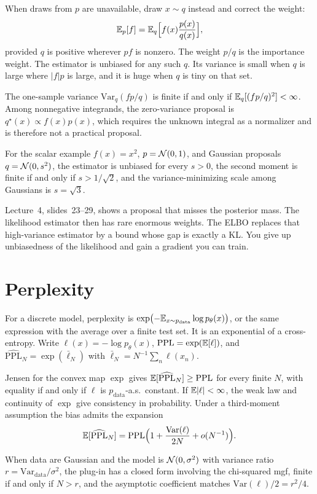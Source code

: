 When draws from $p$ are unavailable, draw $x\sim q$ instead and correct the weight:
\[
\mathbb{E}_p[f]=\mathbb{E}_q\Bigl[f(x)\frac{p(x)}{q(x)}\Bigr],
\]
provided $q$ is positive wherever $p f$ is nonzero. The weight $p/q$ is the importance weight. The estimator is unbiased for any such $q$. Its variance is small when $q$ is large where $\lvert f\rvert p$ is large, and it is huge when $q$ is tiny on that set.

\begin{resultbox}
The one-sample variance $\mathrm{Var}_q(fp/q)$ is finite if and only if $\mathbb{E}_q[(fp/q)^2]<\infty$. Among nonnegative integrands, the zero-variance proposal is $q^\star(x)\propto f(x)p(x)$, which requires the unknown integral as a normalizer and is therefore not a practical proposal.
\end{resultbox}

For the scalar example $f(x)=x^2$, $p=\mathcal{N}(0,1)$, and Gaussian proposals $q=\mathcal{N}(0,s^2)$, the estimator is unbiased for every $s>0$, the second moment is finite if and only if $s>1/\sqrt 2$, and the variance-minimizing scale among Gaussians is $s=\sqrt 3$.

\begin{pitbox}
Lecture~4, slides~23--29, shows a proposal that misses the posterior mass. The likelihood estimator then has rare enormous weights. The ELBO replaces that high-variance estimator by a bound whose gap is exactly a KL. You give up unbiasedness of the likelihood and gain a gradient you can train.
\end{pitbox}

\section{Perplexity}

For a discrete model, perplexity is $\exp\bigl(-\mathbb{E}_{x\sim p_{\mathrm{data}}}\log p_\theta(x)\bigr)$, or the same expression with the average over a finite test set. It is an exponential of a cross-entropy. Write $\ell(x)=-\log p_\theta(x)$, $\mathrm{PPL}=\exp(\mathbb{E}[\ell])$, and $\widehat{\mathrm{PPL}}_N=\exp(\bar\ell_N)$ with $\bar\ell_N=N^{-1}\sum_n\ell(x_n)$.

\begin{resultbox}
Jensen for the convex map $\exp$ gives $\mathbb{E}[\widehat{\mathrm{PPL}}_N]\ge\mathrm{PPL}$ for every finite $N$, with equality if and only if $\ell$ is $p_{\mathrm{data}}$-a.s.\ constant. If $\mathbb{E}|\ell|<\infty$, the weak law and continuity of $\exp$ give consistency in probability. Under a third-moment assumption the bias admits the expansion
\[
\mathbb{E}[\widehat{\mathrm{PPL}}_N]=\mathrm{PPL}\Bigl(1+\frac{\mathrm{Var}(\ell)}{2N}+o(N^{-1})\Bigr).
\]
\end{resultbox}
When data are Gaussian and the model is $\mathcal{N}(0,\sigma^2)$ with variance ratio $r=\mathrm{Var}_{\mathrm{data}}/\sigma^2$, the plug-in has a closed form involving the chi-squared mgf, finite if and only if $N>r$, and the asymptotic coefficient matches $\mathrm{Var}(\ell)/2=r^2/4$.

